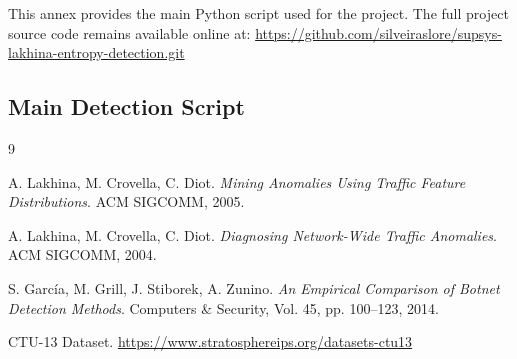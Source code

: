 \documentclass{article}
\begin{document}
This annex provides the main Python script used for the project. The full project source code remains available online at:
\url{https://github.com/silveiraslore/supsys-lakhina-entropy-detection.git}

\subsection{Main Detection Script}


\begin{thebibliography}{9}

A. Lakhina, M. Crovella, C. Diot.
\textit{Mining Anomalies Using Traffic Feature Distributions}.
ACM SIGCOMM, 2005.

A. Lakhina, M. Crovella, C. Diot.
\textit{Diagnosing Network-Wide Traffic Anomalies}.
ACM SIGCOMM, 2004.

S. Garc\'ia, M. Grill, J. Stiborek, A. Zunino.
\textit{An Empirical Comparison of Botnet Detection Methods}.
Computers \& Security, Vol. 45, pp. 100--123, 2014.

CTU-13 Dataset.
\url{https://www.stratosphereips.org/datasets-ctu13}

\end{thebibliography}
\end{document}
